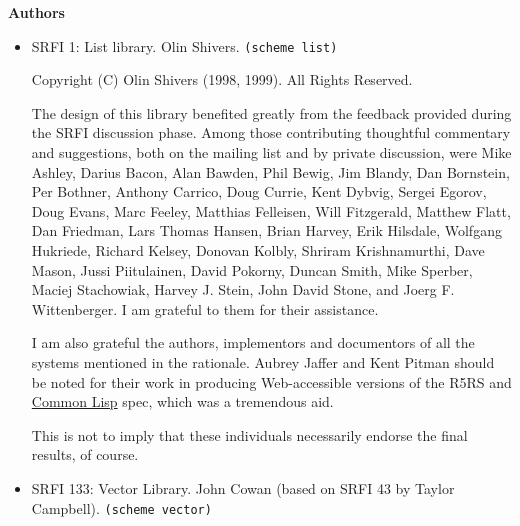 \textbf{Authors}


\begin{itemize}
\item SRFI 1: List library. Olin Shivers.
  \verb|(scheme list)|

Copyright (C) Olin Shivers (1998, 1999). All Rights
Reserved.

The design of this library benefited greatly from the feedback provided
during the SRFI discussion phase. Among those contributing thoughtful
commentary and suggestions, both on the mailing list and by private
discussion, were Mike Ashley, Darius Bacon, Alan Bawden, Phil Bewig, Jim
Blandy, Dan Bornstein, Per Bothner, Anthony Carrico, Doug Currie, Kent
Dybvig, Sergei Egorov, Doug Evans, Marc Feeley, Matthias Felleisen, Will
Fitzgerald, Matthew Flatt, Dan Friedman, Lars Thomas Hansen, Brian
Harvey, Erik Hilsdale, Wolfgang Hukriede, Richard Kelsey, Donovan
Kolbly, Shriram Krishnamurthi, Dave Mason, Jussi Piitulainen, David
Pokorny, Duncan Smith, Mike Sperber, Maciej Stachowiak, Harvey J. Stein,
John David Stone, and Joerg F. Wittenberger. I am grateful to them for
their assistance.

I am also grateful the authors, implementors and documentors of all the
systems mentioned in the rationale. Aubrey Jaffer and Kent Pitman should
be noted for their work in producing Web-accessible versions of the R5RS
and \protect\hyperlink{CommonLisp}{Common Lisp} spec, which was a
tremendous aid.

This is not to imply that these individuals necessarily endorse the
final results, of course.


\item SRFI 133: Vector Library. John Cowan (based on SRFI 43 by Taylor
  Campbell). \verb|(scheme vector)|


\end{itemize}
